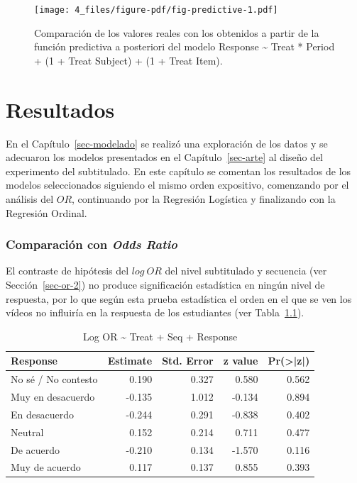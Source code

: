 \documentclass[
  12pt,
  a4paper,
  extrafontsizes,
  onecolumn,
  openright,
  table]{memoir}
\begin{document}
\begin{figure}[h]

{\centering \texttt{[image: 4\_files/figure-pdf/fig-predictive-1.pdf]}

}

\caption[Verificación usando la función predictiva a posteriori del
modelo seleccionado.]{\label{fig-predictive}Comparación de los valores
reales con los obtenidos a partir de la función predictiva a posteriori
del modelo Response \textasciitilde{} Treat * Period + (1 + Treat
\textbar{} Subject) + (1 + Treat \textbar{} Item).}

\end{figure}


\hypertarget{sec-resultados}{%
\chapter{Resultados}\label{sec-resultados}}

En el Capítulo~\ref{sec-modelado} se realizó una exploración de los
datos y se adecuaron los modelos presentados en el
Capítulo~\ref{sec-arte} al diseño del experimento del subtitulado. En
este capítulo se comentan los resultados de los modelos seleccionados
siguiendo el mismo orden expositivo, comenzando por el análisis del
\(OR\), continuando por la Regresión Logística y finalizando con la
Regresión Ordinal.

\hypertarget{sec-or-3}{%
\subsection{\texorpdfstring{Comparación con \emph{Odds
Ratio}}{Comparación con Odds Ratio}}\label{sec-or-3}}

El contraste de hipótesis del \(log\ OR\) del nivel subtitulado y
secuencia (ver Sección~\ref{sec-or-2}) no produce significación
estadística en ningún nivel de respuesta, por lo que según esta prueba
estadística el orden en el que se ven los vídeos no influiría en la
respuesta de los estudiantes (ver Tabla~\ref{tbl-logor1}).

\hypertarget{tbl-logor1}{}
\begin{longtable}{lrrrr}
\caption{\label{tbl-logor1}Log OR \textasciitilde{} Treat + Seq + Response }\tabularnewline

\toprule
Response & Estimate & Std. Error & z value & Pr(>|z|) \\ 
\midrule
No sé / No contesto & 0.190 & 0.327 & 0.580 & 0.562 \\ 
Muy en desacuerdo & -0.135 & 1.012 & -0.134 & 0.894 \\ 
En desacuerdo & -0.244 & 0.291 & -0.838 & 0.402 \\ 
Neutral & 0.152 & 0.214 & 0.711 & 0.477 \\ 
De acuerdo & -0.210 & 0.134 & -1.570 & 0.116 \\ 
Muy de acuerdo & 0.117 & 0.137 & 0.855 & 0.393 \\ 
\bottomrule
\end{longtable}
\end{document}
